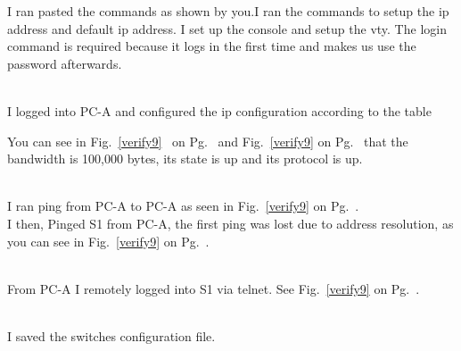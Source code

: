 \documentclass[../EngineeringJournal_CDavis.tex]{subfiles}
\begin{document}
I ran pasted the commands as shown by you.I ran the commands to setup the ip 
address and default ip address. I set up the console and setup the vty. 
The login command is required because it logs in
the first time and makes us use the password afterwards.
\hfill\break

\noindent{}
\\I logged into PC-A and configured the ip configuration according to the table


You can see in Fig.~\ref{verify9}~ 
on Pg.~\pageref{verify9} and Fig.~\ref{verify9} on
Pg.~\pageref{verify9} that the bandwidth is 100,000 bytes,  its state is up and
its protocol is up.
\hfill\break

\noindent{}
\\I ran ping from PC-A to PC-A as seen in
Fig.~\ref{verify9} on Pg.~\pageref{verify9}.
\\I then, Pinged S1 from PC-A, the first ping was lost due to address
resolution, as you can see in Fig.~\ref{verify9} on
Pg.~\pageref{verify9}.
\hfill\break

\noindent{}
\\From PC-A I remotely logged into S1 via telnet. See
Fig.~\ref{verify9} on Pg.~\pageref{verify9}.
\hfill\break

\noindent{}
\\I saved the switches configuration file.
\end{document}
